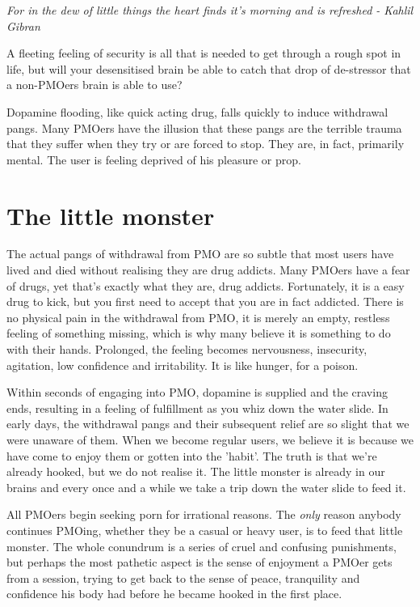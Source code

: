 \documentclass[easypeasy.tex]{subfiles}
\begin{document}
\textit{For in the dew of little things the heart finds it's morning and is refreshed - Kahlil Gibran}

A fleeting feeling of security is all that is needed to get through a rough spot in life, but will your desensitised brain be able to catch that drop of de-stressor that a non-PMOers brain is able to use?

Dopamine flooding, like quick acting drug, falls quickly to induce withdrawal pangs. Many PMOers have the illusion that these pangs are the terrible trauma that they suffer when they try or are forced to stop. They are, in fact, primarily mental. The user is feeling deprived of his pleasure or prop.

\section{The little monster}
The actual pangs of withdrawal from PMO are so subtle that most users have lived and died without realising they are drug addicts. Many PMOers have a fear of drugs, yet that's exactly what they are, drug addicts. Fortunately, it is a easy drug to kick, but you first need to accept that you are in fact addicted. There is no physical pain in the withdrawal from PMO, it is merely an empty, restless feeling of something missing, which is why many believe it is something to do with their hands. Prolonged, the feeling becomes nervousness, insecurity, agitation, low confidence and irritability. It is like hunger, for a poison.

Within seconds of engaging into PMO, dopamine is supplied and the craving ends, resulting in a feeling of fulfillment as you whiz down the water slide. In early days, the withdrawal pangs and their subsequent relief are so slight that we were unaware of them. When we become regular users, we believe it is because we have come to enjoy them or gotten into the 'habit'. The truth is that we're already hooked, but we do not realise it. The little monster is already in our brains and every once and a while we take a trip down the water slide to feed it.

All PMOers begin seeking porn for irrational reasons. The \textit{only} reason anybody continues PMOing, whether they be a casual or heavy user, is to feed that little monster. The whole conundrum is a series of cruel and confusing punishments, but perhaps the most pathetic aspect is the sense of enjoyment a PMOer gets from a session, trying to get back to the sense of peace, tranquility and confidence his body had before he became hooked in the first place.
\end{document}

